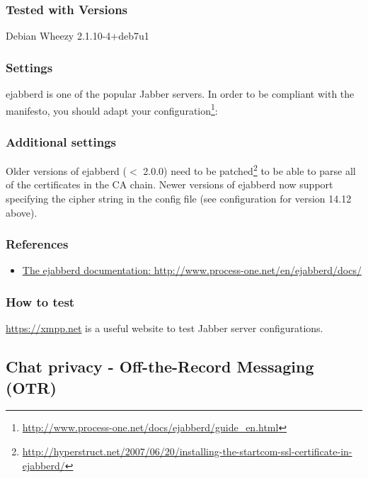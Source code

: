 \subsubsection{Tested with Versions}
\begin{itemize*}
\item Debian Wheezy 2.1.10-4+deb7u1
\end{itemize*}
\subsubsection{Settings}
ejabberd is one of the popular Jabber servers. In order to be compliant
with the manifesto, you should adapt your configuration\footnote{\url{http://www.process-one.net/docs/ejabberd/guide_en.html}}:
%
\subsubsection{Additional settings}
Older versions of ejabberd ($ < $ 2.0.0) need to be patched\footnote{\url{http://hyperstruct.net/2007/06/20/installing-the-startcom-ssl-certificate-in-ejabberd/}} to be able to parse all of the certificates in the CA chain.
Newer versions of ejabberd now support specifying the cipher string in the config file (see configuration for version 14.12 above).

\subsubsection{References}

\begin{itemize}
\item \href{http://www.process-one.net/en/ejabberd/docs/}{The ejabberd documentation: http://www.process-one.net/en/ejabberd/docs/}
\end{itemize}


\subsubsection{How to test}
\begin{itemize*}
  \item \url{https://xmpp.net} is a useful website to test Jabber server configurations.
\end{itemize*}


\subsection{Chat privacy - Off-the-Record Messaging (OTR)}


